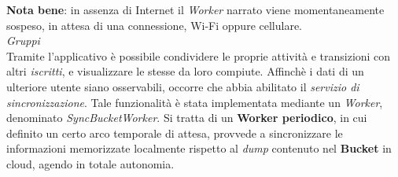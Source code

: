 \documentclass{article}
\begin{document}
    \textbf{Nota bene}: in assenza di Internet il \textit{Worker} narrato viene momentaneamente sospeso, in attesa di una connessione, Wi-Fi oppure cellulare. \vspace*{7pt}\\
    \textit{Gruppi} \vspace*{7pt}\\
    Tramite l'applicativo è possibile condividere le proprie attività e transizioni con altri \textit{iscritti}, e visualizzare le stesse da loro compiute. Affinchè i dati di un ulteriore utente siano osservabili, occorre che abbia abilitato il \textit{servizio di sincronizzazione}. Tale funzionalità è stata implementata mediante un \textit{Worker}, denominato \textit{SyncBucketWorker}. Si tratta di un \textbf{Worker periodico}, in cui definito un certo arco temporale di attesa, provvede a sincronizzare le informazioni memorizzate localmente rispetto al \textit{dump} contenuto nel \textbf{Bucket} in cloud, agendo in totale autonomia.
    \begin{center}
        \begin{figure}[H]
            \centering
        \end{figure}
    \end{center}
\end{document}
